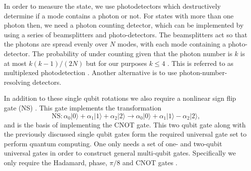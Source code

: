 \documentclass[aps,pra,twocolumn,amsmath,amssymb,nofootinbib,superscriptaddress]{revtex4}
\newcommand{\ket}[1]{|#1\rangle}
\begin{document}
In order to measure the state, we use photodetectors which destructively determine if a mode contains a photon or not. For states with more than one photon then, we need a photon counting detector, which can be implemented by using a series of beamsplitters and photo-detectors. The beamsplitters act so that the photons are spread evenly over $N$ modes, with each mode containing a photo-detector. The probability of under counting given that the photon number is $k$ is at most $k(k-1)/(2N)$ but for our purposes $k \le 4 $ \cite{knill}. This is referred to as multiplexed photodetection \cite{bib:motes2013spontaneous}. Another alternative is to use photon-number-resolving detectors.

In addition to these single qubit rotations we also require a nonlinear sign flip gate (NS) \cite{knill}. This gate implements the transformation 
\begin{equation}
\mathrm{NS}: \alpha_0 \ket{0} + \alpha_1 \ket{1} +\alpha_2 \ket{2} \rightarrow \alpha_0 \ket{0} + \alpha_1 \ket{1} - \alpha_2 \ket{2},
\end{equation}
and is the basis of implementing the CNOT gate. This two qubit gate along with the previously discussed single qubit gates form the required universal gate set to perform quantum computing. One only needs a set of one- and two-qubit universal gates in order to construct general multi-qubit gates. Specifically we only require the Hadamard, phase, $\pi/8$ and CNOT gates \cite{nielsen}.
\end{document}
